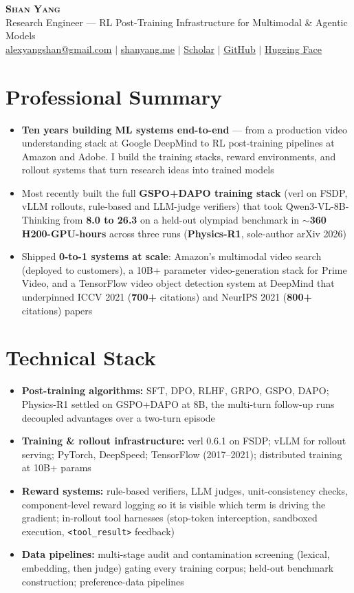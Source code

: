 \documentclass[letterpaper,11pt]{article}
\newcommand{\resumeItem}[1]{
  \item\small{
    {#1 \vspace{-2pt}}
  }
}
\newcommand{\resumeSubItem}[1]{\resumeItem{#1}\vspace{-4pt}}
\newcommand{\resumeSubHeadingListStart}{\begin{itemize}[leftmargin=0.15in, label={}]}
\newcommand{\resumeSubHeadingListEnd}{\end{itemize}}
\newcommand{\resumeItemListStart}{\begin{itemize}[leftmargin=0.15in]}
\newcommand{\resumeItemListEnd}{\end{itemize}\vspace{-5pt}}
\begin{document}
\begin{center}
    \textbf{\Huge \scshape Shan Yang} \\ \vspace{4pt}
    \small Research Engineer --- RL Post-Training Infrastructure for Multimodal \& Agentic Models \\
    \vspace{4pt}
    \href{mailto:alexyangshan@gmail.com}{\underline{alexyangshan@gmail.com}} $|$
    \href{https://shanyang.me}{\underline{shanyang.me}} $|$
    \href{https://scholar.google.com/citations?user=WLk8ZikAAAAJ}{\underline{Scholar}} $|$
    \href{https://github.com/shanyang-me}{\underline{GitHub}} $|$
    \href{https://huggingface.co/shanyangmie}{\underline{Hugging Face}}
\end{center}

\section{Professional Summary}
  \resumeItemListStart
    \resumeItem{\textbf{Ten years building ML systems end-to-end} --- from a production video understanding stack at Google DeepMind to RL post-training pipelines at Amazon and Adobe. I build the training stacks, reward environments, and rollout systems that turn research ideas into trained models}
    \resumeItem{Most recently built the full \textbf{GSPO+DAPO training stack} (verl on FSDP, vLLM rollouts, rule-based and LLM-judge verifiers) that took Qwen3-VL-8B-Thinking from \textbf{8.0 to 26.3} on a held-out olympiad benchmark in \textbf{$\sim$360 H200-GPU-hours} across three runs (\textbf{Physics-R1}, sole-author arXiv 2026)}
    \resumeItem{Shipped \textbf{0-to-1 systems at scale}: Amazon's multimodal video search (deployed to customers), a 10B+ parameter video-generation stack for Prime Video, and a TensorFlow video object detection system at DeepMind that underpinned ICCV 2021 (\textbf{700+} citations) and NeurIPS 2021 (\textbf{800+} citations) papers}
  \resumeItemListEnd

\section{Technical Stack}
  \resumeSubHeadingListStart
    \resumeSubItem{\textbf{Post-training algorithms:} SFT, DPO, RLHF, GRPO, GSPO, DAPO; Physics-R1 settled on GSPO+DAPO at 8B, the multi-turn follow-up runs decoupled advantages over a two-turn episode}
    \resumeSubItem{\textbf{Training \& rollout infrastructure:} verl 0.6.1 on FSDP; vLLM for rollout serving; PyTorch, DeepSpeed; TensorFlow (2017--2021); distributed training at 10B+ params}
    \resumeSubItem{\textbf{Reward systems:} rule-based verifiers, LLM judges, unit-consistency checks, component-level reward logging so it is visible which term is driving the gradient; in-rollout tool harnesses (stop-token interception, sandboxed execution, \texttt{<tool\_result>} feedback)}
    \resumeSubItem{\textbf{Data pipelines:} multi-stage audit and contamination screening (lexical, embedding, then judge) gating every training corpus; held-out benchmark construction; preference-data pipelines}
  \resumeSubHeadingListEnd
\end{document}
